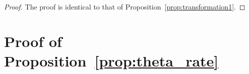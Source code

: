 \documentclass{article}
\begin{document}
\begin{proof}

The proof is identical to that of Proposition~\ref{prop:transformation1}.
\end{proof}

















\section{Proof of Proposition~\ref{prop:theta_rate}}
\label{sec:theta_rate_proof}





\end{document}
